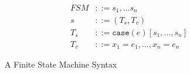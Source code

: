 \begin{figure}
\begin{align*}
FSM & ::= s_1,\ldots s_n \\
s & ::= (T_s, T_v) \\
T_s & ::= \mathtt{case}(e)[s_1, \ldots,s_n] \\
T_v & ::= x_1=e_1, \ldots, x_n=e_n
\end{align*}
\caption{A Finite State Machine Syntax}
\label{fig:fsm_syntax}
\end{figure}
